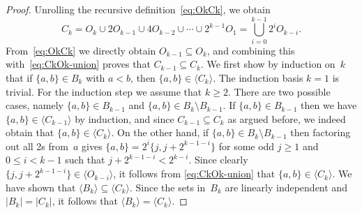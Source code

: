 \documentclass[11pt]{article}
\newcommand{\seq}{\subseteq}
\begin{document}
%
\begin{proof}
Unrolling the recursive definition~\eqref{eq:OkCk}, we obtain
\begin{equation}
\label{eq:CkOk-union}
 C_k=O_k\cup 2O_{k-1}\cup 4O_{k-2}\cup\cdots\cup 2^{k-1}O_1=\bigcup_{i=0}^{k-1} 2^i O_{k-i}.
\end{equation}
From~\eqref{eq:OkCk} we directly obtain $O_{k-1}\seq O_k$, and combining this with~\eqref{eq:CkOk-union} proves that $C_{k-1}\seq C_k$.
%
We first show by induction on~$k$ that if $\{a,b\}\in B_k$ with $a<b$, then $\{a,b\}\in \langle C_k \rangle$.
The induction basis $k=1$ is trivial.
For the induction step we assume that $k\geq 2$.
There are two possible cases, namely $\{a,b\}\in B_{k-1}$ and $\{a,b\}\in B_k\setminus B_{k-1}$.
If $\{a,b\}\in B_{k-1}$ then we have $\{a,b\}\in \langle C_{k-1}\rangle$ by induction, and since $C_{k-1}\subseteq C_k$ as argued before, we indeed obtain that $\{a,b\}\in\langle C_k\rangle$.
On the other hand, if $\{a,b\}\in B_k\setminus B_{k-1}$ then factoring out all 2s from~$a$ gives $\{a,b\}=2^i\{j,j+2^{k-1-i}\}$ for some odd $j\geq 1$ and $0\le i<k-1$ such that $j+2^{k-1-i}<2^{k-i}$.
Since clearly $\{j,j+2^{k-1-i}\} \in \langle O_{k-i}\rangle$, it follows from \eqref{eq:CkOk-union} that $\{a,b\}\in \langle C_k \rangle$.
%
We have shown that $\langle B_k\rangle \seq \langle C_k\rangle$.
Since the sets in~$B_k$ are linearly independent and $|B_k|=|C_k|$, it follows that $\langle B_k\rangle =\langle C_k\rangle$.
\end{proof}
%
\end{document}
